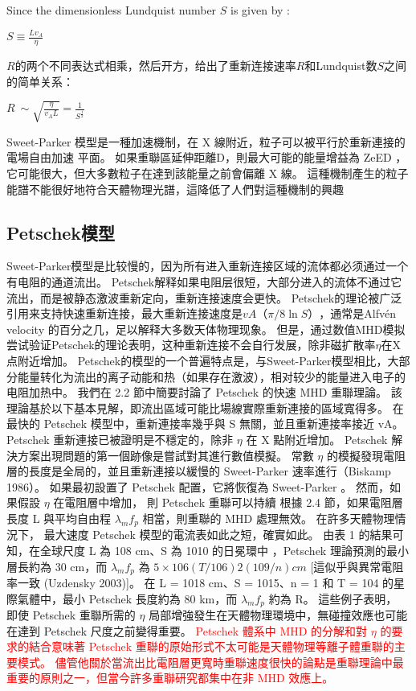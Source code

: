 \documentclass[12pt, a4paper, oneside]{article}
\begin{document}
\begin{spacing}{2.0}
Since the dimensionless Lundquist number $S$ is given by
: 
\begin{center}
    $\displaystyle S \equiv \frac{Lv_A}{\eta}$
\end{center}
$R$的两个不同表达式相乘，然后开方，给出了重新连接速率$R$和Lundquist数$S$之间的简单关系：
\begin{center}
    $\displaystyle R ~ \sim \sqrt{\frac{\eta}{v_A L}} = \frac{1}{S^\frac{1}{2}}$
\end{center}
Sweet-Parker 模型是一種加速機制，在 X 線附近，粒子可以被平行於重新連接的電場自由加速
平面。 如果重聯區延伸距離D，則最大可能的能量增益為 ZeED ，它可能很大，但大多數粒子在達到該能量之前會偏離 X 線。 
這種機制產生的粒子能譜不能很好地符合天體物理光譜，這降低了人們對這種機制的興趣\cite{zweibel2009magnetic}

\subsection{Petschek模型}
Sweet-Parker模型是比较慢的，因为所有进入重新连接区域的流体都必须通过一个有电阻的通道流出。
Petschek解释如果电阻层很短，大部分进入的流体不通过它流出，而是被静态激波重新定向，重新连接速度会更快。
Petschek的理论被广泛引用来支持快速重新连接，最大重新连接速度是$vA（π/8 \ln S）$，通常是Alfvén velocity 的百分之几，足以解释大多数天体物理现象。
但是，通过数值MHD模拟尝试验证Petschek的理论表明，这种重新连接不会自行发展，除非磁扩散率$\eta$在X点附近增加。
Petschek的模型的一个普遍特点是，与Sweet-Parker模型相比，大部分能量转化为流出的离子动能和热（如果存在激波），相对较少的能量进入电子的电阻加热中。
我們在 2.2 節中簡要討論了 Petschek 的快速 MHD 重聯理論。 該理論基於以下基本見解，即流出區域可能比場線實際重新連接的區域寬得多。 
在最快的 Petschek 模型中，重新連接率幾乎與 S 無關，並且重新連接率接近 vA。 Petschek 重新連接已被證明是不穩定的，除非 $\eta$ 在 X 點附近增加。 
Petschek 解決方案出現問題的第一個跡像是嘗試對其進行數值模擬。 常數 $\eta$ 的模擬發現電阻層的長度是全局的，並且重新連接以緩慢的 Sweet-Parker 
速率進行（Biskamp 1986）。 如果最初設置了 Petschek 配置，它將恢復為 Sweet-Parker 。 然而，如果假設 $\eta$ 在電阻層中增加，
則 Petschek 重聯可以持續 
根據 2.4 節，如果電阻層長度 L 與平均自由程 $\lambda_m f_p$ 相當，則重聯的 MHD 處理無效。 在許多天體物理情況下，
最大速度 Petschek 模型的電流表如此之短，確實如此。 由表 1 的結果可知，在全球尺度 L 為 108 cm、S 為 1010 的日冕環中
，Petschek 理論預測的最小層長約為 30 cm，而 $\lambda_m f_p$ 為 $5 \times 106 (T/106) 2(109/n) cm$ [這似乎與異常電阻率一致 (Uzdensky 2003)]。 
在 L = 1018 cm、S = 1015、n = 1 和 T = 104 的星際氣體中，最小 Petschek 長度約為 80 km，而 $\lambda_m f_p$ 約為 R。 這些例子表明，
即使 Petschek 重聯所需的 $\eta$ 局部增強發生在天體物理環境中，無碰撞效應也可能在達到 Petschek 尺度之前變得重要。
\textcolor{red}{Petschek 體系中 MHD 的分解和對 $\eta$ 的要求的結合意味著 Petschek 重聯的原始形式不太可能是天體物理等離子體重聯的主要模式。 
儘管他關於當流出比電阻層更寬時重聯速度很快的論點是重聯理論中最重要的原則之一，但當今許多重聯研究都集中在非 MHD 效應上。}


\end{spacing}
\end{document}
